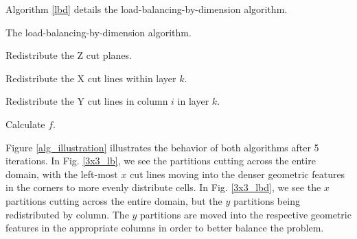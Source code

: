 Algorithm \ref{lbd} details the load-balancing-by-dimension algorithm. 
\begin{algorithm}[H]
\caption{The load-balancing-by-dimension algorithm.}
\label{lbd}
\begin{algorithmic}

    \STATE Redistribute the Z cut planes.
  \ENDWHILE  
  
      \STATE Redistribute the X cut lines within layer $k$. 
    \ENDWHILE
  \ENDFOR
  
        \STATE Redistribute the Y cut lines in column $i$ in layer $k$. 
      \ENDWHILE
    \ENDFOR
  \ENDFOR
  
  \STATE Calculate $f$.
\end{algorithmic}
\end{algorithm}

Figure \ref{alg_illustration} illustrates the behavior of both algorithms after 5 iterations. In Fig. \ref{3x3_lb}, we see the partitions cutting across the entire domain, with the left-most $x$ cut lines moving into the denser geometric features in the corners to more evenly distribute cells. In Fig. \ref{3x3_lbd}, we see the $x$ partitions cutting across the entire domain, but the $y$ partitions being redistributed by column. The $y$ partitions are moved into the respective geometric features in the appropriate columns in order to better balance the problem.

